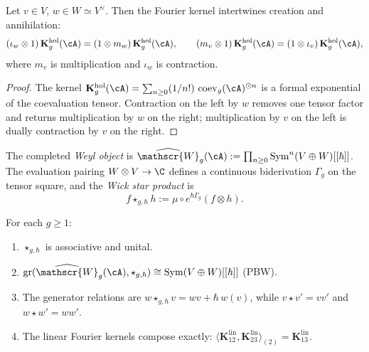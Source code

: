 \begin{theorem}
\label{thm:holo-comp-fourier-transport}
Let $v \in V$, $w \in W \simeq V^\vee$. Then the Fourier kernel
intertwines creation and annihilation:
\begin{equation}\label{eq:holo-comp-fourier-intertwining}
(\iota_w \otimes 1)\,\mathbf{K}_g^{\mathrm{hol}}(\cA)
=
(1 \otimes m_w)\,\mathbf{K}_g^{\mathrm{hol}}(\cA),
\qquad
(m_v \otimes 1)\,\mathbf{K}_g^{\mathrm{hol}}(\cA)
=
(1 \otimes \iota_v)\,\mathbf{K}_g^{\mathrm{hol}}(\cA),
\end{equation}
where $m_v$ is multiplication and $\iota_w$ is contraction.
\end{theorem}

\begin{proof}
The kernel $\mathbf{K}_g^{\mathrm{hol}}(\cA) =
\sum_{n \geq 0} (1/n!)\,\operatorname{coev}_g(\cA)^{\odot n}$
is a formal exponential of the coevaluation tensor. Contraction
on the left by $w$ removes one tensor factor and returns
multiplication by $w$ on the right; multiplication by $v$ on the
left is dually contraction by $v$ on the right.
\end{proof}

\begin{definition}
\label{def:holo-comp-weyl-wick}
The completed \emph{Weyl object} is
$\widehat{\mathscr{W}}_g(\cA) :=
\prod_{n \geq 0} \operatorname{Sym}^n(V \oplus W)[[\hbar]]$.
The evaluation pairing $W \otimes V \to \C$ defines a continuous
biderivation $\Gamma_g$ on the tensor square, and the
\emph{Wick star product} is
\begin{equation}\label{eq:holo-comp-wick-star}
f \star_{g,\hbar} h
:=
\mu \circ e^{\hbar \Gamma_g}(f \otimes h).
\end{equation}
\end{definition}

\begin{theorem}
\label{thm:holo-comp-weyl-sewing}
For each $g \geq 1$:
\begin{enumerate}[label=\textup{(\roman*)}]
\item $\star_{g,\hbar}$ is associative and unital.
\item $\operatorname{gr}(\widehat{\mathscr{W}}_g(\cA),
 \star_{g,\hbar}) \cong \operatorname{Sym}(V \oplus W)[[\hbar]]$
 (PBW).
\item The generator relations are
 $w \star_{g,\hbar} v = wv + \hbar\, w(v)$,
 while $v \star v' = vv'$ and $w \star w' = ww'$.
\item The linear Fourier kernels compose exactly:
 $\langle \mathbf{K}_{12}^{\mathrm{lin}},
 \mathbf{K}_{23}^{\mathrm{lin}}\rangle_{(2)}
 = \mathbf{K}_{13}^{\mathrm{lin}}$.
\end{enumerate}
\end{theorem}

